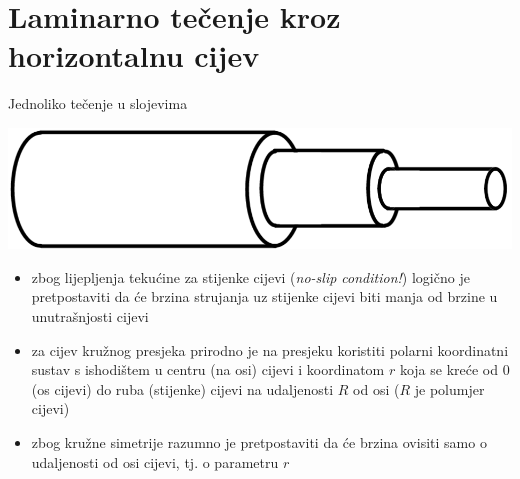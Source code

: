 \documentclass[croatian]{beamer}
\begin{document}
\section{Laminarno tečenje kroz horizontalnu cijev}
\begin{frame}{Jednoliko tečenje u slojevima}

\begin{center}
\includegraphics[width=0.5\paperwidth]{slike/slika5.PNG}
\par\end{center}
\begin{itemize}
\item zbog lijepljenja tekućine za stijenke cijevi (\emph{no-slip condition!})
logično je pretpostaviti da će brzina strujanja uz stijenke cijevi
biti manja od brzine u unutrašnjosti cijevi
\item za cijev kružnog presjeka prirodno je na presjeku koristiti polarni
koordinatni sustav s ishodištem u centru (na osi) cijevi i koordinatom
$r$ koja se kreće od $0$ (os cijevi) do ruba (stijenke) cijevi na
udaljenosti $R$ od osi ($R$ je polumjer cijevi)
\item zbog kružne simetrije razumno je pretpostaviti da će brzina ovisiti
samo o udaljenosti od osi cijevi, tj. o parametru $r$
\end{itemize}
\end{frame}
\end{document}
